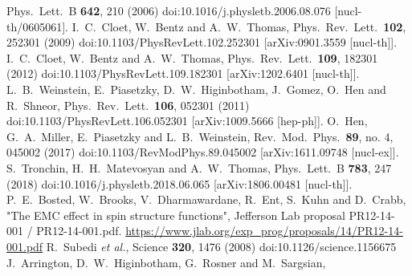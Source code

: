 \documentclass{ws-ijmpe}
\begin{document}
\begin{thebibliography}{0}
  Phys.\ Lett.\ B {\bf 642}, 210 (2006)
  doi:10.1016/j.physletb.2006.08.076
  [nucl-th/0605061].
%
  I.~C.~Cloet, W.~Bentz and A.~W.~Thomas,
  Phys.\ Rev.\ Lett.\  {\bf 102}, 252301 (2009)
  doi:10.1103/PhysRevLett.102.252301
  [arXiv:0901.3559 [nucl-th]].
%
  I.~C.~Cloet, W.~Bentz and A.~W.~Thomas,
  Phys.\ Rev.\ Lett.\  {\bf 109}, 182301 (2012)
  doi:10.1103/PhysRevLett.109.182301
  [arXiv:1202.6401 [nucl-th]].
%
  L.~B.~Weinstein, E.~Piasetzky, D.~W.~Higinbotham, J.~Gomez, O.~Hen and R.~Shneor,
  Phys.\ Rev.\ Lett.\  {\bf 106}, 052301 (2011)
  doi:10.1103/PhysRevLett.106.052301
  [arXiv:1009.5666 [hep-ph]].
%
  O.~Hen, G.~A.~Miller, E.~Piasetzky and L.~B.~Weinstein,
  Rev.\ Mod.\ Phys.\  {\bf 89}, no. 4, 045002 (2017)
  doi:10.1103/RevModPhys.89.045002
  [arXiv:1611.09748 [nucl-ex]].
%
  S.~Tronchin, H.~H.~Matevosyan and A.~W.~Thomas,
  Phys.\ Lett.\ B {\bf 783}, 247 (2018)
  doi:10.1016/j.physletb.2018.06.065
  [arXiv:1806.00481 [nucl-th]].
%
P.~E.~Bosted, W.~Brooks, V.~Dharmawardane, R.~Ent, S.~Kuhn and D.~Crabb,
"The EMC effect in spin structure functions", Jefferson Lab proposal PR12-14-001 / PR12-14-001.pdf.
\url{https://www.jlab.org/exp_prog/proposals/14/PR12-14-001.pdf}
%
R.~Subedi {\em et al.}, Science {\bf 320}, 1476 (2008)
  doi:10.1126/science.1156675
%
  J.~Arrington, D.~W.~Higinbotham, G.~Rosner and M.~Sargsian,

\end{thebibliography}
\end{document}
